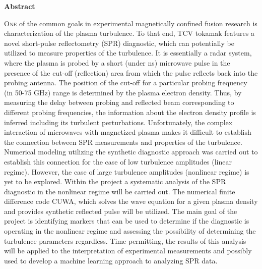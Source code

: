 \documentclass[11pt,a4paper]{report}
\begin{document}
\begin{center}
    \vspace*{1.5cm}\Large{\textbf{Abstract}}
    \vspace*{1cm}
    \fontsize{11}{18}\selectfont

    \begin{minipage}{.7\linewidth}
        \lettrine[lines=4]{\color{black} O}{ne} of the common goals in experimental magnetically confined fusion research is characterization of the plasma turbulence. To that end, TCV tokamak features a novel short-pulse reflectometry (SPR) diagnostic, which can potentially be utilized to measure properties of the turbulence.
        It is essentially a radar system, where the plasma is probed by a short (under ns) microwave pulse in the presence of the cut-off (reflection) area from which the pulse reflects back into the probing antenna. The position of the cut-off for a particular probing frequency (in 50-75 GHz) range is determined by the plasma electron density. Thus, by measuring the delay between probing and reflected beam corresponding to different probing frequencies, the information about the electron density profile is inferred including its turbulent perturbations.
        Unfortunately, the complex interaction of microwaves with magnetized plasma makes it difficult to establish the connection between SPR measurements and properties of the turbulence. Numerical modeling utilizing the synthetic diagnostic approach was carried out to establish this connection for the case of low turbulence amplitudes (linear regime). However, the case of large turbulence amplitudes (nonlinear regime) is yet to be explored.
        Within the project a systematic analysis of the SPR diagnostic in the nonlinear regime will be carried out. The numerical finite difference code CUWA, which solves the wave equation for a given plasma density and provides synthetic reflected pulse will be utilized. The main goal of the project is identifying markers that can be used to determine if the diagnostic is operating in the nonlinear regime and assessing the possibility of determining the turbulence parameters regardless. Time permitting, the results of this analysis will be applied to the interpretation of experimental measurements and possibly used to develop a machine learning approach to analyzing SPR data.
    \end{minipage}
\end{center}
\end{document}
